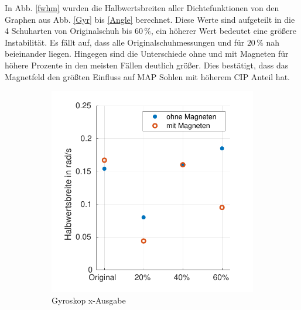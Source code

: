 In Abb. \ref{fwhm} wurden die Halbwertsbreiten aller Dichtefunktionen von den Graphen aus Abb. \ref{Gyr} bis \ref{Angle} berechnet. Diese Werte sind aufgeteilt in die 4 Schuharten von Originalschuh bis $60\,\%$, ein höherer Wert bedeutet eine größere Instabilität. Es fällt auf, dass alle Originalschuhmessungen und für $20\,\%$ nah beieinander liegen. Hingegen sind die Unterschiede ohne und mit Magneten für höhere Prozente in den meisten Fällen deutlich größer. Dies bestätigt, dass das Magnetfeld den größten Einfluss auf MAP Sohlen mit höherem CIP Anteil hat. 
\begin{figure}[tb!]
	\centering
	\begin{adjustwidth}{-0.1\linewidth}{-0.1\linewidth}
		\begin{subfigure}[c]{.32\linewidth}
			\centering
			\includegraphics[width=\linewidth]{Bilder/fwhm_GyrX.pdf}
			\caption{Gyroskop x-Ausgabe}
			\vspace{5pt}
		\end{subfigure}
		\hfill
		\begin{subfigure}[c]{.32\linewidth}
			\centering

\end{subfigure}
\end{adjustwidth}
\end{figure}
